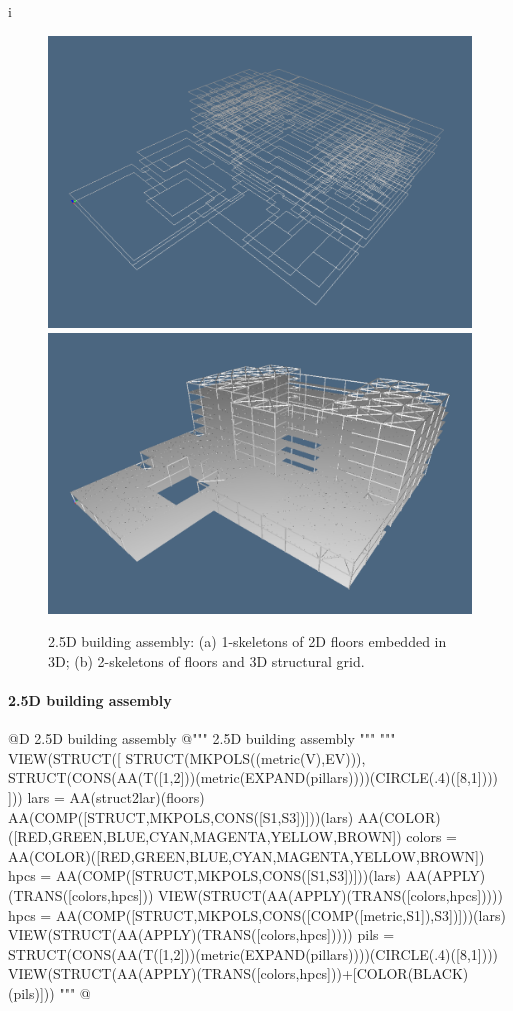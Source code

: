 i\documentclass[11pt,oneside]{article}    %
\begin{document}
\begin{figure}[htbp] %
   \centering
   \includegraphics[height=0.35\linewidth,width=0.495\linewidth]{images/floor3D} 
   \includegraphics[height=0.35\linewidth,width=0.495\linewidth]{images/floor3Da} 
   \caption{2.5D building assembly: (a) 1-skeletons of 2D floors embedded in 3D; (b) 2-skeletons of floors and 3D structural grid.}
   \label{fig:example}
\end{figure}




\paragraph{2.5D building assembly}
@D 2.5D building assembly
@{""" 2.5D building assembly """    
"""    
VIEW(STRUCT([ STRUCT(MKPOLS((metric(V),EV))), STRUCT(CONS(AA(T([1,2]))(metric(EXPAND(pillars))))(CIRCLE(.4)([8,1]))) ]))
lars = AA(struct2lar)(floors)
AA(COMP([STRUCT,MKPOLS,CONS([S1,S3])]))(lars)
AA(COLOR)([RED,GREEN,BLUE,CYAN,MAGENTA,YELLOW,BROWN])
colors = AA(COLOR)([RED,GREEN,BLUE,CYAN,MAGENTA,YELLOW,BROWN])
hpcs = AA(COMP([STRUCT,MKPOLS,CONS([S1,S3])]))(lars)
AA(APPLY)(TRANS([colors,hpcs]))
VIEW(STRUCT(AA(APPLY)(TRANS([colors,hpcs]))))
hpcs = AA(COMP([STRUCT,MKPOLS,CONS([COMP([metric,S1]),S3])]))(lars)
VIEW(STRUCT(AA(APPLY)(TRANS([colors,hpcs]))))
pils = STRUCT(CONS(AA(T([1,2]))(metric(EXPAND(pillars))))(CIRCLE(.4)([8,1])))
VIEW(STRUCT(AA(APPLY)(TRANS([colors,hpcs]))+[COLOR(BLACK)(pils)]))
"""
@}
\end{document}
